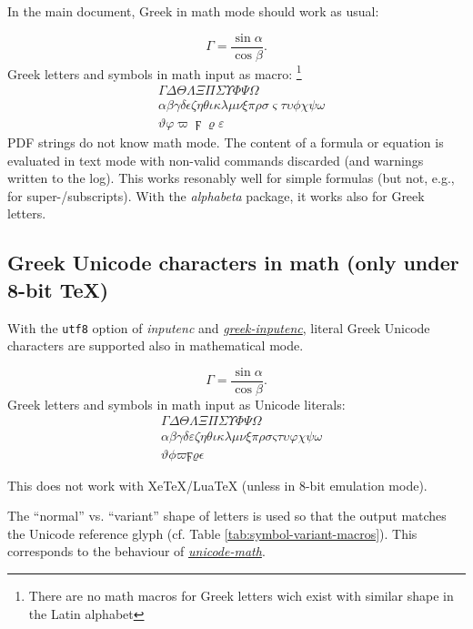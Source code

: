 \documentclass{article}
\begin{document}
In the main document, Greek in math mode should work as usual:

\[\Gamma = \frac{\sin\alpha}{\cos{\beta}}.
\]
Greek letters and symbols in math input as macro:%
\footnote{There are no math macros for Greek letters wich exist with similar
shape in the Latin alphabet}
\begin{align*}
  &
  \Gamma{} \Delta{}
  \Theta{}
  \Lambda{}
  \Xi{}
  \Pi{}
  \Sigma{}
  \Upsilon{} \Phi{}
  \Psi{} \Omega{}
\\&
  \alpha{} \beta{} \gamma{} \delta{} \epsilon{} \zeta{} \eta{} \theta{}
  \iota{} \kappa{} \lambda{} \mu{} \nu{} \xi{}
  \pi{} \rho{}
  \sigma{} \varsigma{} \tau{} \upsilon{} \phi{} \chi{} \psi{} \omega{}
\\&
  \vartheta \varphi \varpi \digamma{} \varrho \varepsilon
\end{align*}
%
PDF strings do not know math mode. The content of a formula or equation is
evaluated in text mode with non-valid commands discarded (and warnings
written to the log). This works resonably well for simple formulas (but not,
e.g., for super-/subscripts). With the \emph{alphabeta} package, it works
also for Greek letters.

\subsection{Greek Unicode characters in math (only under 8-bit TeX)}

With the \texttt{utf8} option of \emph{inputenc} and
\href{http://www.ctan.org/pkg/greek-inputenc}{\emph{greek-inputenc}},
literal Greek Unicode characters are supported also in
mathematical mode.

\ifdefined\DeclareUnicodeCharacter
  \[
       Γ = \frac{\sin α}{\cos β}.
  \]
  Greek letters and symbols in math input as Unicode literals:
  \begin{align*}
               & Γ ΔΘΛΞΠΣΥ ΦΨ Ω \\
                 & αβγδεζηθικλμνξπρσςτυφχψω \\
               & ϑϕϖϝϱϵ
  \end{align*}
\fi

This does not work with XeTeX/LuaTeX (unless in 8-bit emulation mode).

The ``normal'' vs. ``variant'' shape of letters is used so that the output
matches the Unicode reference glyph (cf. Table
\ref{tab:symbol-variant-macros}). This corresponds to the behaviour of
\href{http://www.ctan.org/pkg/unicode-math}{\emph{unicode-math}}.
\end{document}
